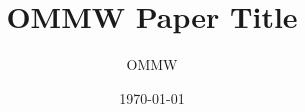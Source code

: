 \documentclass[12pt,a4paper]{article}
\title{OMMW Paper Title}
\author{OMMW}
\date{\today}
\begin{document}
\maketitle

\begin{abstract}
\end{abstract}

\tableofcontents










\end{document}
